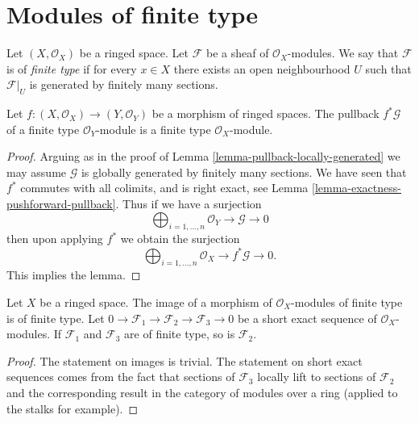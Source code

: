 \section{Modules of finite type}
\label{section-finite-type}

\begin{definition}
\label{definition-finite-type}
Let $(X, \mathcal{O}_X)$ be a ringed space.
Let $\mathcal{F}$ be a sheaf of $\mathcal{O}_X$-modules.
We say that $\mathcal{F}$ is of {\it finite type}
if for every $x \in X$ there exists an open
neighbourhood $U$ such that $\mathcal{F}|_U$
is generated by finitely many sections.
\end{definition}

\begin{lemma}
\label{lemma-pullback-finite-type}
Let $f : (X, \mathcal{O}_X) \to (Y, \mathcal{O}_Y)$
be a morphism of ringed spaces.
The pullback $f^*\mathcal{G}$ of a finite type
$\mathcal{O}_Y$-module is a finite type $\mathcal{O}_X$-module.
\end{lemma}

\begin{proof}
Arguing as in the proof of Lemma \ref{lemma-pullback-locally-generated}
we may assume $\mathcal{G}$ is globally generated by finitely
many sections.
We have seen that $f^*$ commutes with all colimits,
and is right exact, see Lemma \ref{lemma-exactness-pushforward-pullback}.
Thus if we have a surjection
$$
\bigoplus\nolimits_{i = 1, \ldots, n}
\mathcal{O}_Y
\to
\mathcal{G}
\to
0
$$
then upon applying $f^*$ we obtain the surjection
$$
\bigoplus\nolimits_{i = 1, \ldots, n}
\mathcal{O}_X
\to
f^*\mathcal{G}
\to
0.
$$
This implies the lemma.
\end{proof}

\begin{lemma}
\label{lemma-extension-finite-type}
Let $X$ be a ringed space.
The image of a morphism of $\mathcal{O}_X$-modules of finite
type is of finite type.
Let
$0 \to \mathcal{F}_1 \to \mathcal{F}_2 \to \mathcal{F}_3 \to 0$
be a short exact sequence of $\mathcal{O}_X$-modules.
If $\mathcal{F}_1$ and $\mathcal{F}_3$ are of finite type,
so is $\mathcal{F}_2$.
\end{lemma}

\begin{proof}
The statement on images is trivial.
The statement on short exact sequences comes from the
fact that sections of $\mathcal{F}_3$ locally lift to sections
of $\mathcal{F}_2$ and the corresponding result in
the category of modules over a ring (applied to the stalks
for example).
\end{proof}

